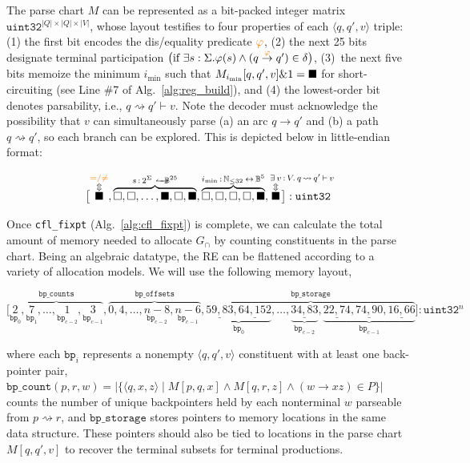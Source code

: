 \documentclass[popl.tex]{subfiles}
\begin{document}
The parse chart $M$ can be represented as a bit-packed integer matrix $\texttt{uint32}^{|Q|\times|Q|\times|V|}$, whose layout testifies to four properties of each $\langle q, q', v\rangle$ triple: (1) the first bit encodes the dis/equality predicate ${\color{orange}\varphi}$, (2) the next 25 bits designate terminal participation $\big(\text{if }\exists s: \Sigma. \varphi(s) \land (q \overset{{\color{orange}\varphi}}{\rightarrow} q')\in \delta\big)$, (3)~the next five bits memoize the minimum $i_{\min}$ such that $M_{i_{\min}}[q, q', v] \& 1 = \blacksquare$ for short-circuiting (see Line \#7 of Alg.~\ref{alg:reg_build}), and (4) the lowest-order bit denotes parsability, i.e., $q\rightsquigarrow q'\vdash v$. Note the decoder must acknowledge the possibility that $v$ can simultaneously parse (a) an arc $q\rightarrow q'$ and (b) a path $q\rightsquigarrow q'$, so each branch can be explored. This is depicted below in little-endian format:\vspace{-0.1cm}

\[
\big[\overset{\overset{\scriptstyle{\color{orange}=/\neq}}{\Updownarrow}}{\bs}, \overbrace{\ws, \ws, \ldots, \bs, \ws, \bs}^{s\,:\,2^\Sigma \,\leftharpoonrightarrow\,\mathbb{B}^{25}}, \overbrace{\ws, \ws, \ws, \ws, \bs}^{i_{\min}\,:\,\mathbb{N}_{\leq 32}\,\leftrightarrow\,\mathbb{B}^{5}}, \overset{\overset{\scriptstyle\exists\,v\mathrlap{\,:\,V.\,q\,\rightsquigarrow\,q'\,\vdash\,v}}{\Updownarrow}}{\bs}\big]: \texttt{uint32}
\]

Once \texttt{cfl\_fixpt} (Alg.~\ref{alg:cfl_fixpt}) is complete, we can calculate the total amount of memory needed to allocate $G_\cap$ by counting constituents in the parse chart. Being an algebraic datatype, the RE can be flattened according to a variety of allocation models. We will use the following memory layout,\vspace{-0.1cm}

\[
\big[\overbrace{\underset{\texttt{bp}_0}{2}, \underset{\texttt{bp}_1}{7}, \ldots, \underset{\texttt{bp}_{c-2}}{1}, \underset{\texttt{bp}_{c-1}}{3}}^{\texttt{bp\_counts}}, \overbrace{0, 4, \ldots, \underset{\texttt{bp}_{c-2}}{n-8}, \underset{\texttt{bp}_{c-1}}{n-6}}^{\texttt{bp\_offsets}}, \overbrace{\underbrace{\underline{59,83}, \underline{64, 152}}_{\texttt{bp}_0}, \ldots, \underbrace{\underline{34, 83}}_{\texttt{bp}_{c-2}}, \underbrace{\underline{22,74},  \underline{74, 90}, \underline{16, 66}}_{\texttt{bp}_{c-1}}}^{\texttt{bp\_storage}}\big]:  \texttt{uint32}^n
\]

\noindent where each $\texttt{bp}_i$ represents a nonempty $\langle q, q', v\rangle$ constituent with at least one back-pointer pair, $\texttt{bp\_count}(p, r, w) = \big|\big\{\langle q, x, z\rangle\mid  M[p, q, x] \land M[q, r, z] \land (w \rightarrow xz)\in P\big\}\big|$ counts the number of unique backpointers held by each nonterminal $w$ parseable from $p \rightsquigarrow r$, and $\texttt{bp\_storage}$ stores pointers to memory locations in the same data structure. These pointers should also be tied to locations in the parse chart $M[q, q', v]$ to recover the terminal subsets for terminal productions.
\end{document}
